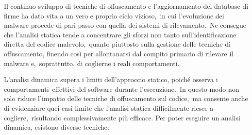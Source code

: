 Il continuo sviluppo di tecniche di offuscamento e l'aggiornamento dei database di firme ha dato vita a un vero e proprio ciclo vizioso,\
in cui l'evoluzione dei malware procede di pari passo con quella dei sistemi di rilevamento.\
Ne consegue che l'analisi statica tende a concentrare gli sforzi non tanto sull'identificazione diretta del codice malevolo,\
quanto piuttosto sulla gestione delle tecniche di offuscamento, finendo così per allontanarsi dal compito primario di rilevare il malware e,\
soprattutto, di coglierne i reali comportamenti.

L'analisi dinamica supera i limiti dell'approccio statico, poiché osserva i comportamenti\
effettivi del software durante l'esecuzione.\
In questo modo non solo riduce l'impatto delle tecniche di offuscamento sul codice,\
ma consente anche di evidenziare quei casi limite che l'analisi statica difficilmente riesce a cogliere,\
risultando complessivamente più efficace.
Per poter eseguire un analisi dinamica, esistono diverse tecniche:

